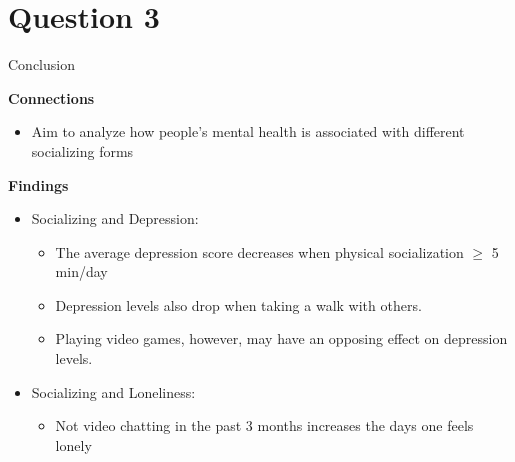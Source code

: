 \documentclass{beamer}
\begin{document}
\section{Question 3}

\begin{frame}{Conclusion}

\textbf{Connections}\\
\begin{itemize}
    \item Aim to analyze how people’s mental health is associated with different socializing forms
\end{itemize}

\textbf{Findings}\\ 
\begin{itemize}
    \item Socializing and Depression:
    \begin{itemize}
        \item The average depression score decreases when physical socialization $\geq $ 5 min/day
        \item Depression levels also drop when taking a walk with others.
        \item Playing video games, however, may have an opposing effect on depression levels.
    \end{itemize}
    \item Socializing and Loneliness:
    \begin{itemize}
        \item Not video chatting in the past 3 months increases the days one feels lonely
    \end{itemize}
\end{itemize}
    
\end{frame}
\end{document}
